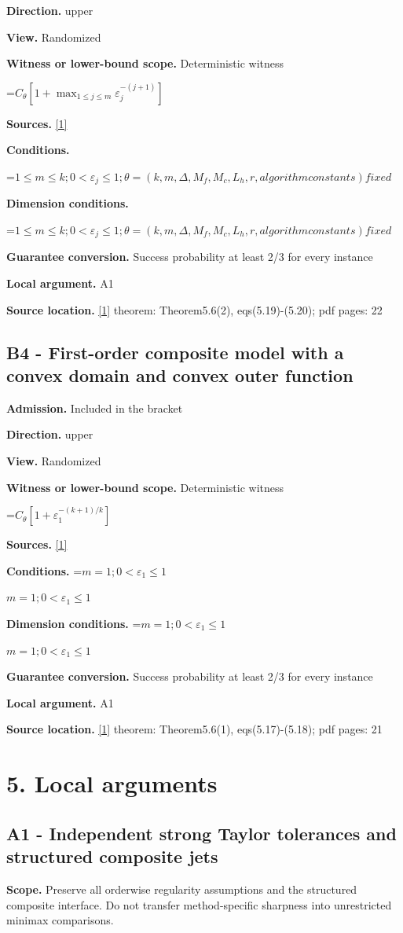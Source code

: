 \documentclass[10pt,a4paper]{article}
\newcommand{\AtlasMath}[1]{\par\begingroup\centering\setbox0=\hbox{$\displaystyle #1$}\ifdim\wd0>1.4\linewidth\typeout{ATLAS WIDE FORMULA: \the\wd0}\fi\ifdim\wd0>\linewidth\resizebox{\linewidth}{!}{\box0}\else\box0\fi\par\endgroup}
\newcommand{\AtlasInlineMath}[1]{\begingroup\setbox0=\hbox{$#1$}\ifdim\wd0>.4\linewidth\endgroup\AtlasMath{#1}\else\endgroup$#1$\fi}
\begin{document}
\textbf{Direction.} upper

\textbf{View.} Randomized

\textbf{Witness or lower-bound scope.} Deterministic witness

\AtlasMath{C_\theta[1+\max_{1\le j\le m}\varepsilon_j^{-(j+1)}]}
\textbf{Sources.} \href{https://optimization-online.org/wp-content/uploads/2020/01/7590.pdf}{[1]}

\textbf{Conditions.} 
\AtlasMath{1\le m\le k;0<\varepsilon_j\le 1;\theta=(k,m,\Delta,M_f,M_c,L_h,r,algorithm constants) fixed}


\textbf{Dimension conditions.} 
\AtlasMath{1\le m\le k;0<\varepsilon_j\le 1;\theta=(k,m,\Delta,M_f,M_c,L_h,r,algorithm constants) fixed}


\textbf{Guarantee conversion.} Success probability at least 2/3 for every instance

\textbf{Local argument.} A1

\textbf{Source location.} \href{https://optimization-online.org/wp-content/uploads/2020/01/7590.pdf}{[1]} theorem: Theorem5.6(2), eqs(5.19)-(5.20); pdf pages: 22

\subsection{B4 - First-order composite model with a convex domain and convex outer function}
\textbf{Admission.} Included in the bracket

\textbf{Direction.} upper

\textbf{View.} Randomized

\textbf{Witness or lower-bound scope.} Deterministic witness

\AtlasMath{C_\theta[1+\varepsilon_1^{-(k+1)/k}]}
\textbf{Sources.} \href{https://optimization-online.org/wp-content/uploads/2020/01/7590.pdf}{[1]}

\textbf{Conditions.} \AtlasInlineMath{m=1;0<\varepsilon_1\le 1}

\textbf{Dimension conditions.} \AtlasInlineMath{m=1;0<\varepsilon_1\le 1}

\textbf{Guarantee conversion.} Success probability at least 2/3 for every instance

\textbf{Local argument.} A1

\textbf{Source location.} \href{https://optimization-online.org/wp-content/uploads/2020/01/7590.pdf}{[1]} theorem: Theorem5.6(1), eqs(5.17)-(5.18); pdf pages: 21

\section{5. Local arguments}
\subsection{A1 - Independent strong Taylor tolerances and structured composite jets}
\textbf{Scope.} Preserve all orderwise regularity assumptions and the structured composite interface. Do not transfer method-specific sharpness into unrestricted minimax comparisons.
\end{document}
